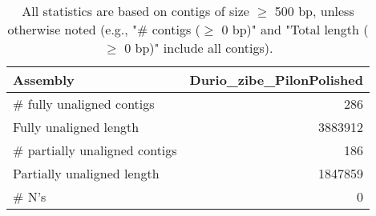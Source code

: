 \documentclass[12pt,a4paper]{article}
\begin{document}
\begin{table}[ht]
\begin{center}
\caption{All statistics are based on contigs of size $\geq$ 500 bp, unless otherwise noted (e.g., "\# contigs ($\geq$ 0 bp)" and "Total length ($\geq$ 0 bp)" include all contigs).}
\begin{tabular}{|l*{1}{|r}|}
\hline
Assembly & Durio\_zibe\_PilonPolished \\ \hline
\# fully unaligned contigs & 286 \\ \hline
Fully unaligned length & 3883912 \\ \hline
\# partially unaligned contigs & 186 \\ \hline
Partially unaligned length & 1847859 \\ \hline
\# N's & 0 \\ \hline
\end{tabular}
\end{center}
\end{table}
\end{document}
